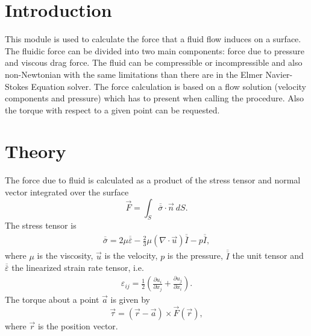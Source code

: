 
\begin{versiona}


\section{Introduction}

This module is used to calculate the force that a fluid flow induces
on a surface. The fluidic force can be divided into two main
components: force due to pressure and viscous drag force. The fluid
can be compressible or incompressible and also non-Newtonian with the
same limitations than there are in the Elmer Navier-Stokes Equation
solver. The force calculation is based on a flow solution (velocity
components and pressure) which has to present when calling the
procedure. Also the torque with respect to a given point can be
requested.


\section{Theory}

The force due to fluid is calculated as a product of the stress
tensor and normal vector integrated over the surface
\begin{equation}
\vec F = \int_S \overline{\overline\sigma}\cdot\vec n~dS.
\end{equation}
The stress tensor is
\begin{eqnarray}
\overline{\overline\sigma} = 2\mu \overline{\overline\varepsilon}
-\frac{2}{3} \mu (\nabla\cdot\vec u)\overline{\overline I} - p 
\overline{\overline I},
\end{eqnarray}
where $\mu$ is the viscosity, $\vec{u}$ is the velocity, $p$ is the
pressure, $\overline{\overline I}$ the unit tensor and
$\overline{\overline \varepsilon}$ the linearized strain rate tensor,
i.e.
\begin{eqnarray}
\varepsilon_{ij} = \frac{1}{2}\left( \frac{\partial u_i}{\partial x_j} +
\frac{\partial u_j}{\partial x_i}
\right).
\end{eqnarray}
The torque about a point $\vec a$ is given by 
\begin{equation}
\vec \tau = (\vec r-\vec a)\times\vec F(\vec r),
\end{equation}
where $\vec r$ is the position vector.



\end{versiona}
